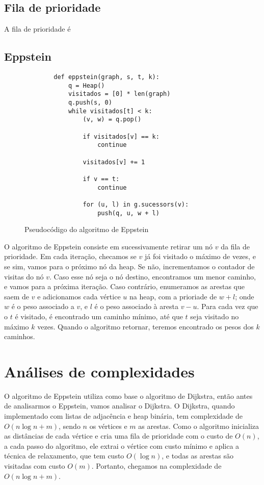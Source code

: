 \documentclass[12pt]{article}
\begin{document}
    \subsection{Fila de prioridade}
    A fila de prioridade é

    \newpage
    \subsection{Eppstein}
    \begin{figure}[htp]
    \centering
    \begin{verbatim}
        def eppstein(graph, s, t, k):
            q = Heap()
            visitados = [0] * len(graph)
            q.push(s, 0)
            while visitados[t] < k:
                (v, w) = q.pop()

                if visitados[v] == k:
                    continue 

                visitados[v] += 1

                if v == t:
                    continue

                for (u, l) in g.sucessors(v):
                    push(q, u, w + l)

    \end{verbatim}
    \label{fig: pseudo}
    \caption{Pseudocódigo do algoritmo de Eppstein}
    \end{figure}

    O algoritmo de Eppstein consiste em sucessivamente retirar um nó $v$ da fila
    de prioridade. Em cada iteração, checamos se $v$ já foi visitado o máximo de
    vezes, e se sim, vamos para o próximo nó da heap. Se não, incrementamos o
    contador de visitas do nó $v$. Caso esse nó seja o nó destino, encontramos
    um menor caminho, e vamos para a próxima iteração. Caso contrário,
    enumeramos as arestas que saem de $v$ e adicionamos cada vértice $u$ na
    heap, com a prioriade de $w + l$; onde $w$ é o peso associado a $v$, e $l$ é
    o peso associado à aresta $v - u$. Para cada vez que o $t$ é visitado, é
    encontrado um caminho mínimo, até que $t$ seja visitado no máximo $k$ vezes.
    Quando o algoritmo retornar, teremos encontrado os pesos dos $k$ caminhos.



    \section{Análises de complexidades}
    O algoritmo de Eppstein utiliza como base o algoritmo de Dijkstra, então antes de analisarmos o Eppstein, vamos analisar o Dijkstra.
    O Dijkstra, quando implementado com listas de adjacência e heap binária, tem complexidade de $O(n\log n + m)$, sendo $n$ os vértices e $m$ as arestas. Como o algoritmo inicializa as distâncias de cada vértice e cria uma fila de prioridade com o custo de $O(n)$, a cada passo do algoritmo, ele extrai o vértice com custo mínimo e aplica a técnica de relaxamento, que tem custo $O(\log n)$, e todas as arestas são visitadas com custo $O(m)$. Portanto, chegamos na complexidade de $O(n\log n + m)$.
    
\end{document}
